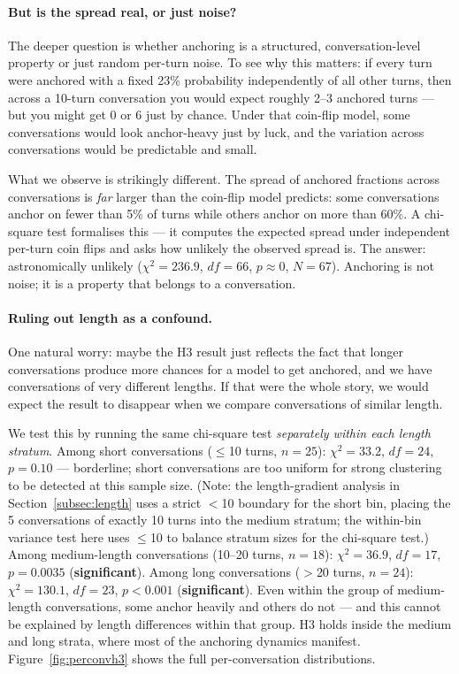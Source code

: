 \documentclass{article}
\begin{document}
\paragraph{But is the spread real, or just noise?}
The deeper question is whether anchoring is a structured,
conversation-level property or just random per-turn noise.
To see why this matters: if every turn were anchored with a fixed
23\% probability independently of all other turns, then across a
10-turn conversation you would expect roughly 2--3 anchored turns
--- but you might get 0 or 6 just by chance.
Under that coin-flip model, some conversations would look
anchor-heavy just by luck, and the variation across conversations
would be predictable and small.

What we observe is strikingly different.
The spread of anchored fractions across conversations is
\emph{far} larger than the coin-flip model predicts: some
conversations anchor on fewer than 5\% of turns while others
anchor on more than 60\%.
A chi-square test formalises this --- it computes the expected
spread under independent per-turn coin flips and asks how
unlikely the observed spread is.
The answer: astronomically unlikely
($\chi^2 = 236.9$, $df = 66$, $p \approx 0$, $N=67$).
Anchoring is not noise; it is a property that belongs to a
conversation.

\paragraph{Ruling out length as a confound.}
One natural worry: maybe the H3 result just reflects the fact
that longer conversations produce more chances for a model to
get anchored, and we have conversations of very different lengths.
If that were the whole story, we would expect the result to
disappear when we compare conversations of similar length.

We test this by running the same chi-square test \emph{separately
within each length stratum}.
Among short conversations ($\leq$10 turns, $n=25$): $\chi^2=33.2$,
$df=24$, $p=0.10$ --- borderline; short conversations are too
uniform for strong clustering to be detected at this sample size.
(Note: the length-gradient analysis in Section~\ref{subsec:length}
uses a strict $<$10 boundary for the short bin, placing the
5 conversations of exactly 10 turns into the medium stratum;
the within-bin variance test here uses $\leq$10 to balance stratum
sizes for the chi-square test.)
Among medium-length conversations (10--20 turns, $n=18$):
$\chi^2=36.9$, $df=17$, $p=0.0035$ (\textbf{significant}).
Among long conversations ($>$20 turns, $n=24$): $\chi^2=130.1$,
$df=23$, $p<0.001$ (\textbf{significant}).
Even within the group of medium-length conversations, some
anchor heavily and others do not --- and this cannot be explained
by length differences within that group.
H3 holds inside the medium and long strata, where most of the
anchoring dynamics manifest.
Figure~\ref{fig:perconvh3} shows the full per-conversation
distributions.
\end{document}

